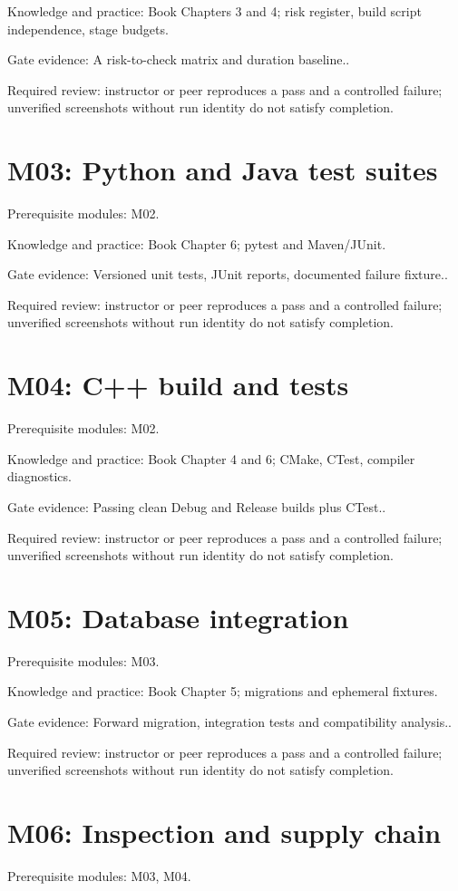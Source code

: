 \documentclass[11pt,letterpaper]{article}
\begin{document}
Knowledge and practice: Book Chapters 3 and 4; risk register, build script independence, stage budgets.

Gate evidence: A risk-to-check matrix and duration baseline..

Required review: instructor or peer reproduces a pass and a controlled failure; unverified screenshots without run identity do not satisfy completion.

\section{M03: Python and Java test suites}
Prerequisite modules: M02.

Knowledge and practice: Book Chapter 6; pytest and Maven/JUnit.

Gate evidence: Versioned unit tests, JUnit reports, documented failure fixture..

Required review: instructor or peer reproduces a pass and a controlled failure; unverified screenshots without run identity do not satisfy completion.

\section{M04: C++ build and tests}
Prerequisite modules: M02.

Knowledge and practice: Book Chapter 4 and 6; CMake, CTest, compiler diagnostics.

Gate evidence: Passing clean Debug and Release builds plus CTest..

Required review: instructor or peer reproduces a pass and a controlled failure; unverified screenshots without run identity do not satisfy completion.

\section{M05: Database integration}
Prerequisite modules: M03.

Knowledge and practice: Book Chapter 5; migrations and ephemeral fixtures.

Gate evidence: Forward migration, integration tests and compatibility analysis..

Required review: instructor or peer reproduces a pass and a controlled failure; unverified screenshots without run identity do not satisfy completion.

\section{M06: Inspection and supply chain}
Prerequisite modules: M03, M04.
\end{document}
